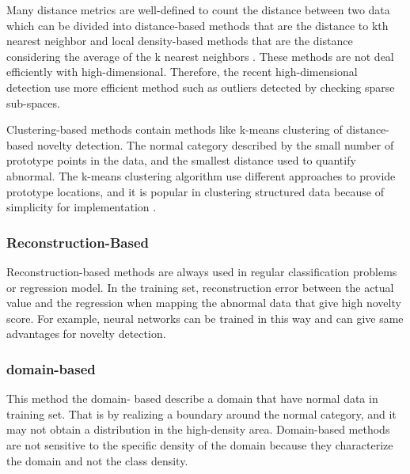 \documentclass[conference]{IEEEtran}
\begin{document}
Many distance metrics are well-defined to count the distance between two data \cite{duda2001pattern} which can be divided into distance-based methods that are the distance to kth nearest neighbor \cite{zhang2006detecting} and local density-based methods that are the distance considering the average of the k nearest neighbors \cite{ismo2004outlier}. These methods are not deal efficiently with high-dimensional. Therefore, the recent high-dimensional detection use more efficient method such as outliers detected by checking sparse sub-spaces.


Clustering-based methods contain methods like k-means clustering of distance-based novelty detection. The normal category described by the small number of prototype points in the data, and the smallest distance used to quantify abnormal.  The k-means clustering algorithm use different approaches to provide prototype locations, and it is popular in clustering structured data because of simplicity for implementation \cite{srivastava2005discovering} \cite{srivastava2006enabling}. 


\subsubsection{Reconstruction-Based}



Reconstruction-based methods are always used in regular classification problems or regression model. In the training set, reconstruction error between the actual value and the regression when mapping the abnormal data that give high novelty score. For example, neural networks can be trained in this way and can give same advantages for novelty detection.


\subsubsection{domain-based}


This method the domain- based describe a domain that have normal data in training set. That is by realizing a boundary around the normal category, and it may not obtain a distribution in the high-density area. Domain-based methods are not sensitive to the specific density of the domain because they characterize the domain and not the class density. 
\end{document}
